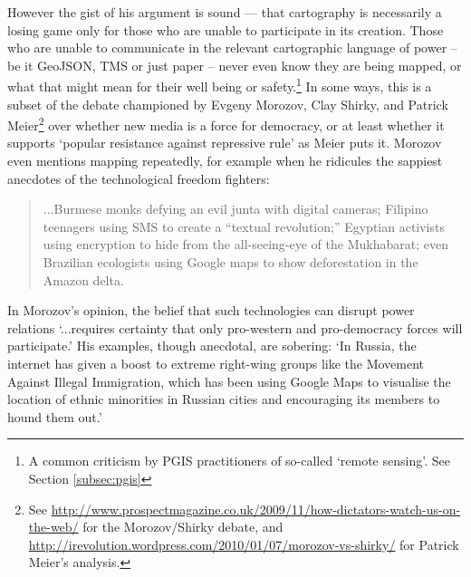 \documentclass[11pt]{report}
\begin{document}
However the gist of his argument is sound --- that cartography is necessarily a losing game only for those who are unable to participate in its creation. Those who are unable to communicate in the relevant cartographic language of power -- be it GeoJSON, \ac{TMS} or just paper -- never even know they are being mapped, or what that might mean for their well being or safety.\footnote{A common criticism by PGIS practitioners of so-called `remote sensing'. See Section \ref{subsec:pgis}} In some ways, this is a subset of the debate championed by Evgeny Morozov, Clay Shirky, and Patrick Meier\footnote{See \url{http://www.prospectmagazine.co.uk/2009/11/how-dictators-watch-us-on-the-web/} for the Morozov/Shirky debate, and \url{http://irevolution.wordpress.com/2010/01/07/morozov-vs-shirky/} for Patrick Meier's analysis.} over whether new media is a force for democracy, or at least whether it supports `popular resistance against repressive rule' as Meier puts it.\cite{meier2010popular} Morozov even mentions mapping repeatedly, for example when he ridicules the sappiest anecdotes of the technological freedom fighters: 
 
\begin{quote}
...Burmese monks defying an evil junta with digital cameras; Filipino teenagers using SMS to create a “textual revolution;” Egyptian activists using encryption to hide from the all-seeing-eye of the Mukhabarat; even Brazilian ecologists using Google maps to show deforestation in the Amazon delta. \cite{morozov2009dictators}
\end{quote}

In Morozov's opinion, the belief that such technologies can disrupt power relations `...requires certainty that only pro-western and pro-democracy forces will participate.' His examples, though anecdotal, are sobering: `In Russia, the internet has given a boost to extreme right-wing groups like the Movement Against Illegal Immigration, which has been using Google Maps to visualise the location of ethnic minorities in Russian cities and encouraging its members to hound them out.' 
\end{document}
